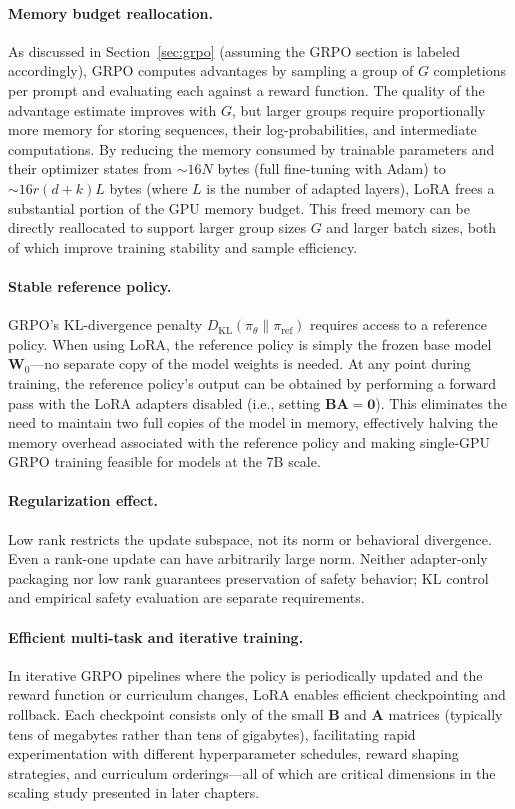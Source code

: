\paragraph{Memory budget reallocation.}
As discussed in Section~\ref{sec:grpo} (assuming the GRPO section is
labeled accordingly), GRPO computes advantages by sampling a group of $G$
completions per prompt and evaluating each against a reward function.
The quality of the advantage estimate improves with $G$, but larger
groups require proportionally more memory for storing sequences, their
log-probabilities, and intermediate computations.  By reducing the memory
consumed by trainable parameters and their optimizer states from
	$\sim 16N$ bytes (full fine-tuning with Adam) to $\sim 16r(d+k)L$
bytes (where $L$ is the number of adapted layers), LoRA frees a
substantial portion of the GPU memory budget.  This freed memory can be
directly reallocated to support larger group sizes $G$ and larger batch
sizes, both of which improve training stability and sample efficiency.

\paragraph{Stable reference policy.}
GRPO's KL-divergence penalty
$D_{\mathrm{KL}}(\pi_\theta \| \pi_{\text{ref}})$ requires access to a
reference policy.  When using LoRA, the reference policy is simply the
frozen base model $\mathbf{W}_0$---no separate copy of the model
weights is needed.  At any point during training, the reference policy's
output can be obtained by performing a forward pass with the LoRA
adapters disabled (i.e., setting $\mathbf{B}\mathbf{A} = \mathbf{0}$).
This eliminates the need to maintain two full copies of the model in
memory, effectively halving the memory overhead associated with the
reference policy and making single-GPU GRPO training feasible for
models at the 7B scale.

\paragraph{Regularization effect.}
Low rank restricts the update subspace, not its norm or behavioral divergence. Even a rank-one update can have arbitrarily large norm. Neither adapter-only packaging nor low rank guarantees preservation of safety behavior; KL control and empirical safety evaluation are separate requirements.

\paragraph{Efficient multi-task and iterative training.}
In iterative GRPO pipelines where the policy is periodically updated and
the reward function or curriculum changes, LoRA enables efficient
checkpointing and rollback.  Each checkpoint consists only of the small
$\mathbf{B}$ and $\mathbf{A}$ matrices (typically tens of megabytes
rather than tens of gigabytes), facilitating rapid experimentation with
different hyperparameter schedules, reward shaping strategies, and
curriculum orderings---all of which are critical dimensions in the
scaling study presented in later chapters.

